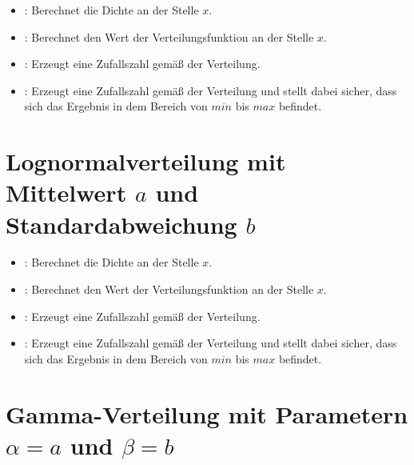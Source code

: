 \begin{itemize}

\item
{}:
Berechnet die Dichte an der Stelle $x$.

\item
{}:
Berechnet den Wert der Verteilungsfunktion an der Stelle $x$.

\item
{}:
Erzeugt eine Zufallszahl gemäß der Verteilung.

\item
{}:
Erzeugt eine Zufallszahl gemäß der Verteilung und stellt dabei sicher, dass sich das Ergebnis in dem Bereich von $min$ bis $max$ befindet.

\end{itemize}



\section{Lognormalverteilung mit Mittelwert \texorpdfstring{$a$}{a} und Standardabweichung \texorpdfstring{$b$}{b}}

\begin{itemize}

\item
{}:
Berechnet die Dichte an der Stelle $x$.

\item
{}:
Berechnet den Wert der Verteilungsfunktion an der Stelle $x$.

\item
{}:
Erzeugt eine Zufallszahl gemäß der Verteilung.

\item
{}:
Erzeugt eine Zufallszahl gemäß der Verteilung und stellt dabei sicher, dass sich das Ergebnis in dem Bereich von $min$ bis $max$ befindet.

\end{itemize}



\section{Gamma-Verteilung mit Parametern \texorpdfstring{$\alpha=a$}{a} und \texorpdfstring{$\beta=b$}{b}}

